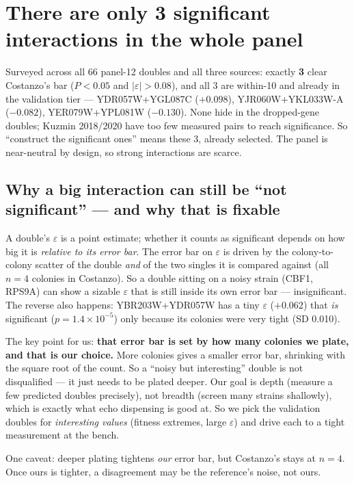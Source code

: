 \section{There are only 3 significant interactions in the whole panel}

Surveyed across all 66 panel-12 doubles and all three sources: exactly \textbf{3} clear
Costanzo's bar ($P<0.05$ and $|\varepsilon|>0.08$), and all 3 are within-10 and already in the
validation tier --- YDR057W+YGL087C ($+0.098$), YJR060W+YKL033W-A ($-0.082$),
YER079W+YPL081W ($-0.130$). None hide in the dropped-gene doubles; Kuzmin 2018/2020 have too
few measured pairs to reach significance. So ``construct the significant ones'' means these 3,
already selected. The panel is near-neutral by design, so strong interactions are scarce.

\subsection{Why a big interaction can still be ``not significant'' --- and why that is fixable}
\label{sec:whyfixable}

A double's $\varepsilon$ is a point estimate; whether it counts as significant depends on how
big it is \emph{relative to its error bar}. The error bar on $\varepsilon$ is driven by the
colony-to-colony scatter of the double \emph{and} of the two singles it is compared against
(all $n=4$ colonies in Costanzo). So a double sitting on a noisy strain (CBF1, RPS9A) can show
a sizable $\varepsilon$ that is still inside its own error bar --- insignificant. The reverse
also happens: YBR203W+YDR057W has a tiny $\varepsilon$ ($+0.062$) that \emph{is} significant
($p=1.4\times10^{-5}$) only because its colonies were very tight (SD 0.010).

The key point for us: \textbf{that error bar is set by how many colonies we plate, and that is
our choice.} More colonies gives a smaller error bar, shrinking with the square root of the
count. So a ``noisy but interesting'' double is not disqualified --- it just needs to be
plated deeper. Our goal is depth (measure a few predicted doubles precisely), not breadth
(screen many strains shallowly), which is exactly what echo dispensing is good at. So we pick
the validation doubles for \emph{interesting values} (fitness extremes, large $\varepsilon$)
and drive each to a tight measurement at the bench.

One caveat: deeper plating tightens \emph{our} error bar, but Costanzo's stays at $n=4$. Once
ours is tighter, a disagreement may be the reference's noise, not ours.

